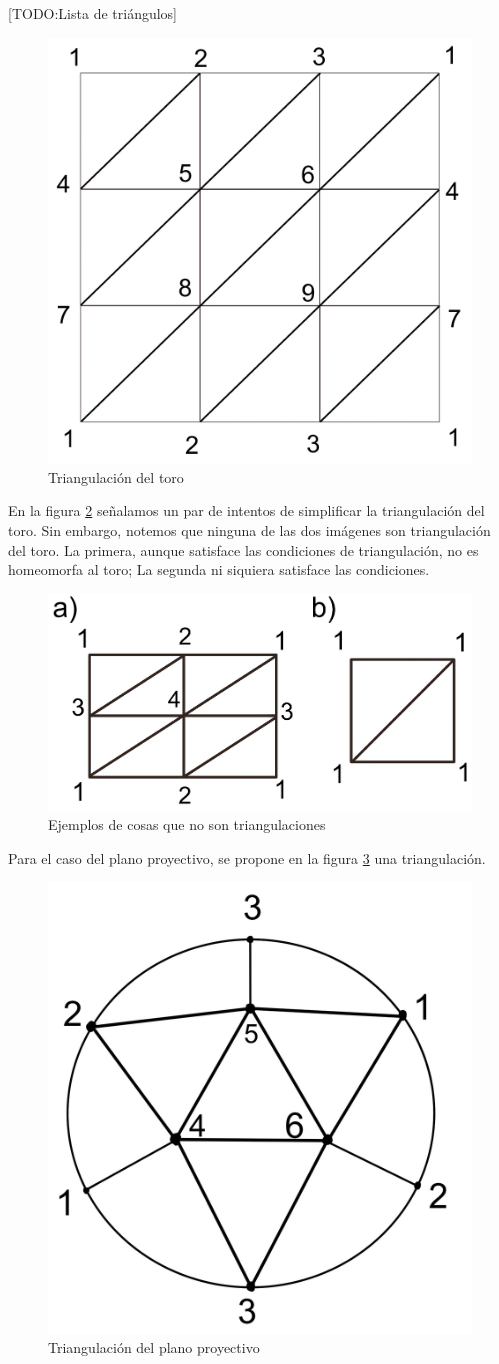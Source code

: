 \documentclass[a4paper,11pt,spanish, twoside, leqno]{tfg-uam}
\theoremstyle{definition}
\begin{document}
[TODO:Lista de triángulos]

\begin{figure}[h!]
	\centering
	\includegraphics[width=0.3\linewidth]{imagenes/toro_triangulado.png}
	\caption{Triangulación del toro}
	\label{fig:toro triangulado}
\end{figure} 

En la figura \ref{fig:no triangulaciones} señalamos un par de intentos de simplificar la triangulación del toro. Sin embargo, notemos que ninguna de las dos imágenes son triangulación del toro. La primera, aunque satisface las condiciones de triangulación, no es homeomorfa al toro; La segunda ni siquiera satisface las condiciones.

\begin{figure}[h!]
	\centering
	\includegraphics[width=0.5\linewidth]{imagenes/no_triangulaciones.png}
	\caption{Ejemplos de cosas que no son triangulaciones}
	
	\label{fig:no triangulaciones}
\end{figure} 

Para el caso del plano proyectivo, se propone en la figura \ref{fig:plano proyectivo triangulado} una triangulación.

\begin{figure}[h!]
	\centering
	\includegraphics[width=0.3\linewidth]{imagenes/planop_triangulado.png}
	\caption{Triangulación del plano proyectivo}
	\label{fig:plano proyectivo triangulado}
\end{figure} 
\end{document}

